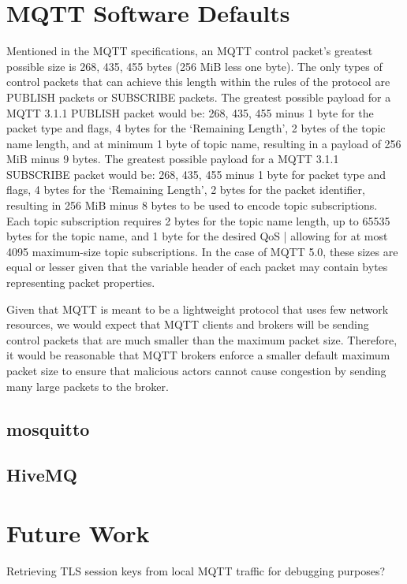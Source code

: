 \documentclass[12pt]{article}
\begin{document}
\section*{MQTT Software Defaults}
Mentioned in the MQTT specifications, an MQTT control packet's greatest possible size is 268, 435, 455 bytes (256 MiB less one byte). The only types of control packets that can achieve this length within the rules of the protocol are PUBLISH packets or SUBSCRIBE packets. The greatest possible payload for a MQTT 3.1.1 PUBLISH packet would be: 268, 435, 455 minus 1 byte for the packet type and flags, 4 bytes for the `Remaining Length', 2 bytes of the topic name length, and at minimum 1 byte of topic name, resulting in a payload of 256 MiB minus 9 bytes. The greatest possible payload for a MQTT 3.1.1 SUBSCRIBE packet would be: 268, 435, 455 minus 1 byte for packet type and flags, 4 bytes for the `Remaining Length', 2 bytes for the packet identifier, resulting in 256 MiB minus 8 bytes to be used to encode topic subscriptions. Each topic subscription requires 2 bytes for the topic name length, up to 65535 bytes for the topic name, and 1 byte for the desired QoS | allowing for at most 4095 maximum-size topic subscriptions. In the case of MQTT 5.0, these sizes are equal or lesser given that the variable header of each packet may contain bytes representing packet properties.\par
Given that MQTT is meant to be a lightweight protocol that uses few network resources, we would expect that MQTT clients and brokers will be sending control packets that are much smaller than the maximum packet size. Therefore, it would be reasonable that MQTT brokers enforce a smaller default maximum packet size to ensure that malicious actors cannot cause congestion by sending many large packets to the broker. 
\subsection*{mosquitto}

\subsection*{HiveMQ}
\section*{Future Work}
Retrieving TLS session keys from local MQTT traffic for debugging purposes?
\end{document}
